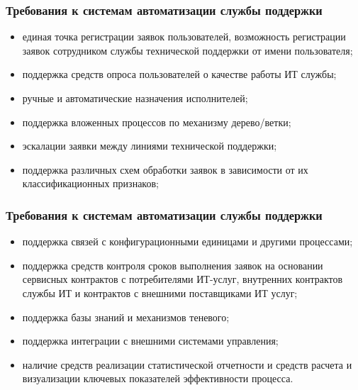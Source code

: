 \documentclass{industrial-development}
\begin{document}
\begin{frame} \frametitle{Требования к системам автоматизации службы поддержки}
	\begin{itemize} 
		\item единая точка регистрации заявок пользователей, возможность регистрации заявок сотрудником службы технической поддержки от имени пользователя;
		\item поддержка средств опроса пользователей о качестве работы ИТ службы;
		\item ручные и автоматические назначения исполнителей;
		\item поддержка вложенных процессов по механизму дерево/ветки;
		\item эскалации заявки между линиями технической поддержки;
		\item поддержка различных схем обработки заявок в зависимости от их классификационных признаков;
	\end{itemize}
\end{frame}
\lecturenotes

\begin{frame} \frametitle{Требования к системам автоматизации службы поддержки}
	\begin{itemize} 
		\item поддержка связей с конфигурационными единицами и другими процессами;
		\item поддержка средств контроля сроков выполнения заявок на основании сервисных контрактов с потребителями ИТ-услуг, внутренних контрактов службы ИТ и контрактов с внешними поставщиками ИТ услуг;
		\item  поддержка базы знаний и механизмов теневого;
		\item поддержка интеграции с внешними системами управления;
		\item наличие средств реализации статистической отчетности и средств расчета и визуализации ключевых показателей эффективности процесса.
	\end{itemize}
\end{frame}
\lecturenotes
\end{document}
